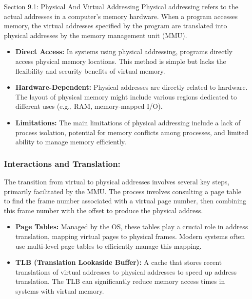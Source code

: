 \begin{notes}{Section 9.1: Physical And Virtual Addressing}
    Physical addressing refers to the actual addresses in a computer's memory hardware. When a program accesses memory, the virtual addresses specified by the program are translated into physical 
    addresses by the memory management unit (MMU).
    
    \begin{itemize}
        \item \textbf{Direct Access:} In systems using physical addressing, programs directly access physical memory locations. This method is simple but lacks the flexibility and security benefits 
        of virtual memory.
        \item \textbf{Hardware-Dependent:} Physical addresses are directly related to hardware. The layout of physical memory might include various regions dedicated to different uses (e.g., RAM, memory-mapped I/O).
        \item \textbf{Limitations:} The main limitations of physical addressing include a lack of process isolation, potential for memory conflicts among processes, and limited ability to manage 
        memory efficiently.
    \end{itemize}
    
    \subsubsection*{Interactions and Translation:}

    The transition from virtual to physical addresses involves several key steps, primarily facilitated by the MMU. The process involves consulting a page table to find the frame number associated 
    with a virtual page number, then combining this frame number with the offset to produce the physical address.
    
    \begin{itemize}
        \item \textbf{Page Tables:} Managed by the OS, these tables play a crucial role in address translation, mapping virtual pages to physical frames. Modern systems often use multi-level page 
        tables to efficiently manage this mapping.
        \item \textbf{TLB (Translation Lookaside Buffer):} A cache that stores recent translations of virtual addresses to physical addresses to speed up address translation. The TLB can significantly 
        reduce memory access times in systems with virtual memory.
    \end{itemize}
    

\end{notes}
